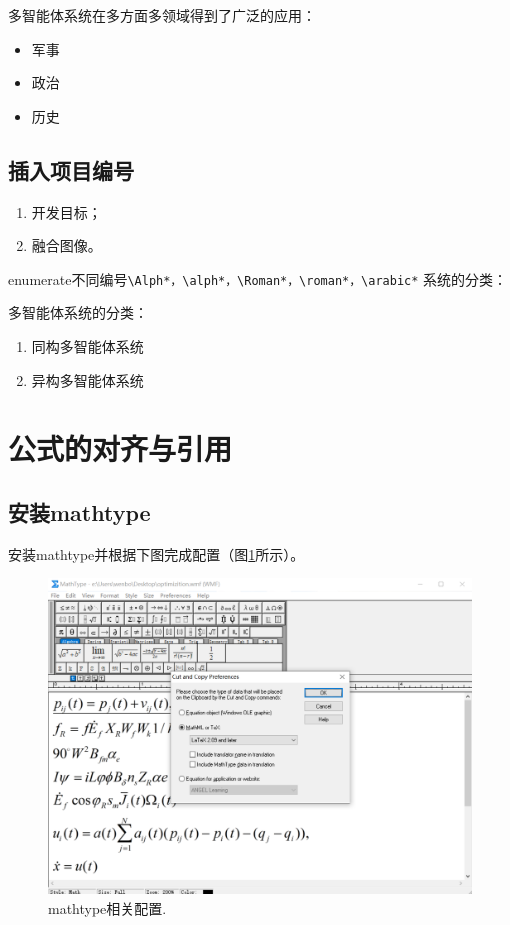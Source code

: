 多智能体系统在多方面多领域得到了广泛的应用：
\begin{itemize}
  \item 军事
  \item 政治
  \item 历史
\end{itemize}

\subsection{插入项目编号}

\begin{enumerate}[leftmargin=2em,itemsep=2pt,topsep=0pt,parsep=0pt,label=\alph*)]
  \item 开发目标；
  \item 融合图像。
\end{enumerate}

enumerate不同编号\verb+\Alph*，\alph*，\Roman*，\roman*，\arabic*+
系统的分类：

多智能体系统的分类：
\begin{enumerate}
  \item 同构多智能体系统
  \item 异构多智能体系统
\end{enumerate}

\section{公式的对齐与引用}

\subsection{安装mathtype}
安装mathtype并根据下图完成配置（图\ref{fig_mathtype1}所示）。
 \begin{figure}[!htb]
  \centering
  \includegraphics[width=1\textwidth]{manual/figures/mathtype配置}
  \caption{mathtype相关配置.}
  \label{fig_mathtype1}
\end{figure}

